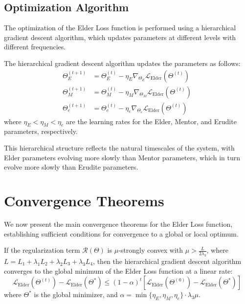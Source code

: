 \subsection{Optimization Algorithm}

The optimization of the Elder Loss function is performed using a hierarchical gradient descent algorithm, which updates parameters at different levels with different frequencies.

\begin{definition}
The hierarchical gradient descent algorithm updates the parameters as follows:
\begin{align}
\Theta_E^{(t+1)} &= \Theta_E^{(t)} - \eta_E \nabla_{\Theta_E} \mathcal{L}_{\text{Elder}}(\Theta^{(t)}) \\
\Theta_M^{(t+1)} &= \Theta_M^{(t)} - \eta_M \nabla_{\Theta_M} \mathcal{L}_{\text{Elder}}(\Theta^{(t)}) \\
\Theta_e^{(t+1)} &= \Theta_e^{(t)} - \eta_e \nabla_{\Theta_e} \mathcal{L}_{\text{Elder}}(\Theta^{(t)})
\end{align}
where $\eta_E < \eta_M < \eta_e$ are the learning rates for the Elder, Mentor, and Erudite parameters, respectively.
\end{definition}

This hierarchical structure reflects the natural timescales of the system, with Elder parameters evolving more slowly than Mentor parameters, which in turn evolve more slowly than Erudite parameters.

\section{Convergence Theorems}

We now present the main convergence theorems for the Elder Loss function, establishing sufficient conditions for convergence to a global or local optimum.

\begin{theorem}
If the regularization term $\mathcal{R}(\Theta)$ is $\mu$-strongly convex with $\mu > \frac{L}{2\lambda_3}$, where $L = L_1 + \lambda_1 L_2 + \lambda_2 L_3 + \lambda_3 L_4$, then the hierarchical gradient descent algorithm converges to the global minimum of the Elder Loss function at a linear rate:
\begin{equation}
\mathcal{L}_{\text{Elder}}(\Theta^{(t)}) - \mathcal{L}_{\text{Elder}}(\Theta^*) \leq (1 - \alpha)^t [\mathcal{L}_{\text{Elder}}(\Theta^{(0)}) - \mathcal{L}_{\text{Elder}}(\Theta^*)]
\end{equation}
where $\Theta^*$ is the global minimizer, and $\alpha = \min\{\eta_E, \eta_M, \eta_e\} \cdot \lambda_3 \mu$.
\end{theorem}

